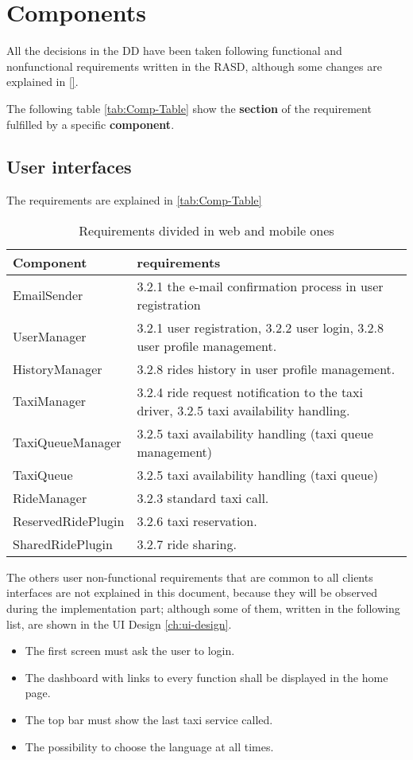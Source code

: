 \section{Components}
All the decisions in the DD have been taken following functional and nonfunctional requirements written in the RASD, although some changes are explained in \autoref{}. %

The following table \autoref{tab:Comp-Table} show the {\bf section} of the requirement fulfilled by a specific {\bf component}. 
\subsection{User interfaces}
The requirements are explained in \autoref{tab:Comp-Table}
\begin{table}[h]
\begin{center}
\begin{tabular}{|p{}|p{}|}
\hline
{\bf Component}  & {\bf requirements}\\
\hline
EmailSender & 3.2.1 the e-mail confirmation process in user registration \\
\hline
UserManager & 3.2.1 user registration, 3.2.2 user login, 3.2.8 user profile management.\\
\hline
HistoryManager & 3.2.8 rides history in user profile management.\\
\hline
TaxiManager & 3.2.4 ride request notification to the taxi driver, 3.2.5 taxi availability handling.\\
\hline
TaxiQueueManager & 3.2.5 taxi availability handling (taxi queue management) \\
\hline
TaxiQueue & 3.2.5 taxi availability handling (taxi queue)\\
\hline
RideManager & 3.2.3 standard taxi call.\\
\hline 
ReservedRidePlugin & 3.2.6 taxi reservation.\\
\hline
SharedRidePlugin & 3.2.7 ride sharing.\\
\hline
\end{tabular}
\caption{Requirements divided in web and mobile ones}
\label{tab:Comp-Table}
\end{center}
\end{table}




The others user non-functional requirements that are common to all clients interfaces are not explained in this document, because they will be observed during the implementation part; although some of them, written in the following list, are shown in the UI Design \autoref{ch:ui-design}.
\begin{itemize}
\item The first screen must ask the user to login.
\item The dashboard with links to every function shall be displayed in the home page.
\item The top bar must show the last taxi service called.
\item The possibility to choose the language at all times.
\end{itemize}



